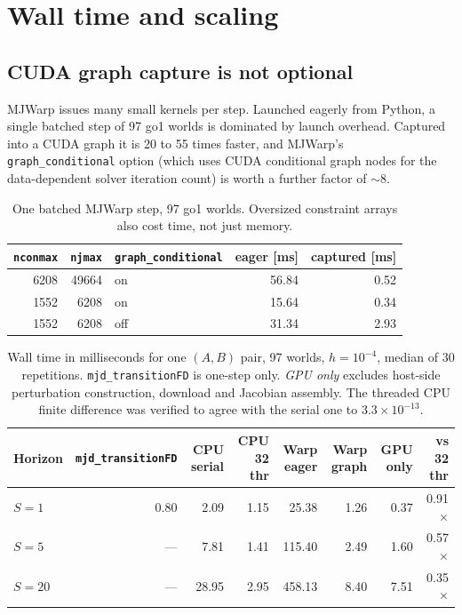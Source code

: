 \documentclass[11pt,a4paper]{article}
\newcommand{\code}[1]{\texttt{\small #1}}
\begin{document}
\section{Wall time and scaling}

\subsection{CUDA graph capture is not optional}
MJWarp issues many small kernels per step. Launched eagerly from Python, a single batched
step of 97 go1 worlds is dominated by launch overhead. Captured into a CUDA graph it is 20 to
55 times faster, and MJWarp's \code{graph\_conditional} option (which uses CUDA conditional
graph nodes for the data-dependent solver iteration count) is worth a further factor of
$\sim$8.

\begin{table}[htbp]
\centering
\footnotesize
\caption{One batched MJWarp step, 97 go1 worlds. Oversized constraint arrays also cost time, not just memory.}
\label{tab:graphmode}
\begin{tabular}{rrlrr}
\toprule
\code{nconmax} & \code{njmax} & \code{graph\_conditional} & \textbf{eager [ms]} & \textbf{captured [ms]} \\
\midrule
6208 & 49664 & on & 56.84 & 0.52 \\
1552 & 6208 & on & 15.64 & 0.34 \\
1552 & 6208 & off & 31.34 & 2.93 \\
\bottomrule
\end{tabular}
\end{table}

\begin{table}[htbp]
\centering
\footnotesize
\caption{Wall time in milliseconds for one $(A,B)$ pair, 97 worlds, $h=10^{-4}$, median of 30 repetitions. \code{mjd\_transitionFD} is one-step only. \emph{GPU only} excludes host-side perturbation construction, download and Jacobian assembly. The threaded CPU finite difference was verified to agree with the serial one to $3.3\times10^{-13}$.}
\label{tab:bench}
\begin{tabular}{lrrrrrrr}
\toprule
\textbf{Horizon} & \code{mjd\_transitionFD} & \textbf{CPU serial} & \textbf{CPU 32 thr} & \textbf{Warp eager} & \textbf{Warp graph} & \textbf{GPU only} & \textbf{vs 32 thr} \\
\midrule
$S=1$ & 0.80 & 2.09 & 1.15 & 25.38 & 1.26 & 0.37 & 0.91$\times$ \\
$S=5$ & --- & 7.81 & 1.41 & 115.40 & 2.49 & 1.60 & 0.57$\times$ \\
$S=20$ & --- & 28.95 & 2.95 & 458.13 & 8.40 & 7.51 & 0.35$\times$ \\
\bottomrule
\end{tabular}
\end{table}
\end{document}

